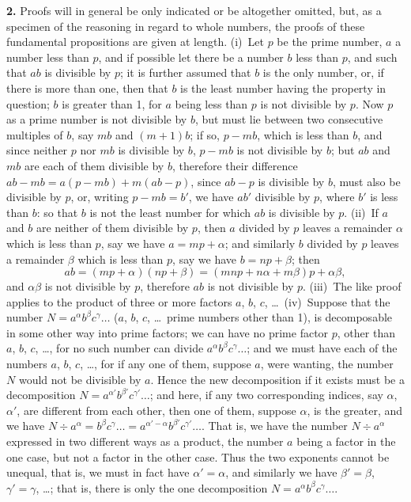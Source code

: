 \documentclass[11pt,a4paper]{book}
\begin{document}
\textbf{2.} Proofs will in general be only indicated or be altogether omitted, but, as a specimen of the reasoning in regard to whole numbers, the proofs of these fundamental propositions are given at length. (i)~Let $p$ be the prime number, $a$ a number less than $p$, and if possible let there be a number $b$ less than $p$, and such that $ab$ is divisible by $p$; it is further assumed that $b$ is the only number, or, if there is more than one, then that $b$ is the least number having the property in question; $b$ is greater than 1, for $a$ being less than $p$ is not divisible by $p$. Now $p$ as a prime number is not divisible by $b$, but must lie between two consecutive multiples of $b$, say $mb$ and $(m+1)b$; if so, $p-mb$, which is less than $b$, and since neither $p$ nor $mb$ is divisible by $b$, $p-mb$ is not divisible by $b$; but $ab$ and $mb$ are each of them divisible by $b$, therefore their difference $ab-mb=a(p-mb)+m(ab-p)$, since $ab-p$ is divisible by $b$, must also be divisible by $p$, or, writing $p-mb=b'$, we have $ab'$ divisible by $p$, where $b'$ is less than $b$: so that $b$ is not the least number for which $ab$ is divisible by $p$. (ii)~If $a$ and $b$ are neither of them divisible by $p$, then $a$ divided by $p$ leaves a remainder $\alpha$ which is less than $p$, say we have $a=mp+\alpha$; and similarly $b$ divided by $p$ leaves a remainder $\beta$ which is less than $p$, say we have $b=np+\beta$; then
\[
ab=(mp+\alpha)(np+\beta)=(mnp+n\alpha+m\beta)p+\alpha\beta,
\]
and $\alpha\beta$ is not divisible by $p$, therefore $ab$ is not divisible by $p$. (iii)~The like proof applies to the product of three or more factors $a$, $b$, $c$, \ldots\ (iv)~Suppose that the number $N=a^\alpha b^\beta c^\gamma\ldots$ ($a$, $b$, $c$, \ldots\ prime numbers other than 1), is decomposable in some other way into prime factors; we can have no prime factor $p$, other than $a$, $b$, $c$, \ldots, for no such number can divide $a^\alpha b^\beta c^\gamma\ldots$; and we must have each of the numbers $a$, $b$, $c$, \ldots, for if any one of them, suppose $a$, were wanting, the number $N$ would not be divisible by $a$. Hence the new decomposition if it exists must be a decomposition $N=a^{\alpha'}b^{\beta'}c^{\gamma'}\ldots$; and here, if any two corresponding indices, say $\alpha$, $\alpha'$, are different from each other, then one of them, suppose $\alpha$, is the greater, and we have $N\div a^\alpha=b^\beta c^\gamma\ldots=a^{\alpha'-\alpha}b^{\beta'}c^{\gamma'}\ldots$. That is, we have the number $N\div a^\alpha$ expressed in two different ways as a product, the number $a$ being a factor in the one case, but not a factor in the other case. Thus the two exponents cannot be unequal, that is, we must in fact have $\alpha'=\alpha$, and similarly we have $\beta'=\beta$, $\gamma'=\gamma$, \ldots; that is, there is only the one decomposition $N=a^\alpha b^\beta c^\gamma\ldots$.
\end{document}
